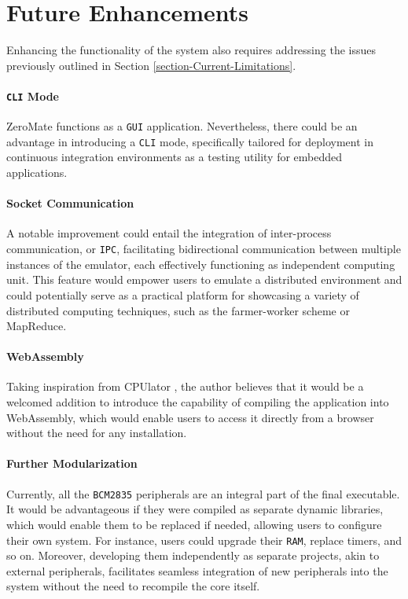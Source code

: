 \documentclass[english, ing, kiv, he, iso690numb, pdf]{fasthesis}
\begin{document}
	\section{Future Enhancements}
	
	Enhancing the functionality of the system also requires addressing the issues previously outlined in Section \ref{section-Current-Limitations}.
	
	\paragraph{\texttt{CLI} Mode}
	
	ZeroMate functions as a \texttt{GUI} application. Nevertheless, there could be an advantage in introducing a \texttt{CLI} mode, specifically tailored for deployment in continuous integration environments as a testing utility for embedded applications.
	
	\paragraph{Socket Communication}
	
	A notable improvement could entail the integration of inter-process communication, or \texttt{IPC}, facilitating bidirectional communication between multiple instances of the emulator, each effectively functioning as independent computing unit. This feature would empower users to emulate a distributed environment and could potentially serve as a practical platform for showcasing a variety of distributed computing techniques, such as the farmer-worker scheme or MapReduce.
	
	\paragraph{WebAssembly}
	
	Taking inspiration from CPUlator \cite{CPUlator}, the author believes that it would be a welcomed addition to introduce the capability of compiling the application into WebAssembly, which would enable users to access it directly from a browser without the need for any installation.
	
	\paragraph{Further Modularization}
	
	Currently, all the \texttt{BCM2835} peripherals are an integral part of the final executable. It would be advantageous if they were compiled as separate dynamic libraries, which would enable them to be replaced if needed, allowing users to configure their own system. For instance, users could upgrade their \texttt{RAM}, replace timers, and so on. Moreover, developing them independently as separate projects, akin to external peripherals, facilitates seamless integration of new peripherals into the system without the need to recompile the core itself.
	
\end{document}
